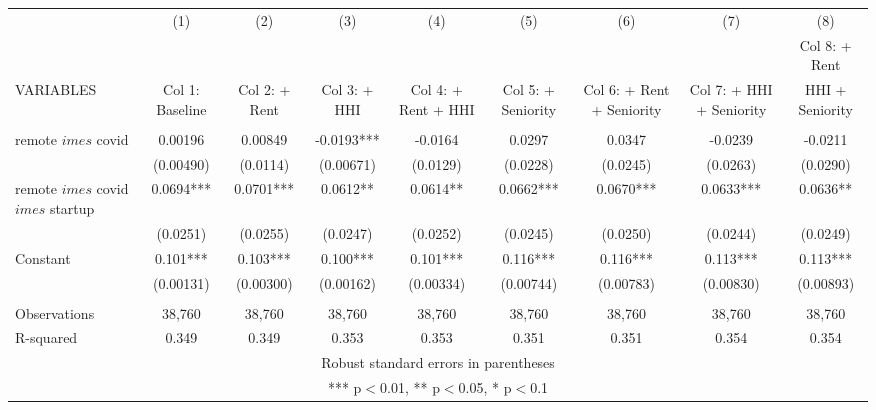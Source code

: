 \documentclass[]{article}
\begin{document}
\begin{tabular}{lcccccccc} \hline
 & (1) & (2) & (3) & (4) & (5) & (6) & (7) & (8) \\
 &  &  &  &  &  &  &  & Col 8: + Rent \\
VARIABLES & Col 1: Baseline & Col 2: + Rent & Col 3: + HHI & Col 4: + Rent + HHI & Col 5: + Seniority & Col 6: + Rent + Seniority & Col 7: + HHI + Seniority & HHI + Seniority \\ \hline
 &  &  &  &  &  &  &  &  \\
remote $	imes$ covid & 0.00196 & 0.00849 & -0.0193*** & -0.0164 & 0.0297 & 0.0347 & -0.0239 & -0.0211 \\
 & (0.00490) & (0.0114) & (0.00671) & (0.0129) & (0.0228) & (0.0245) & (0.0263) & (0.0290) \\
remote $	imes$ covid $	imes$ startup & 0.0694*** & 0.0701*** & 0.0612** & 0.0614** & 0.0662*** & 0.0670*** & 0.0633*** & 0.0636** \\
 & (0.0251) & (0.0255) & (0.0247) & (0.0252) & (0.0245) & (0.0250) & (0.0244) & (0.0249) \\
Constant & 0.101*** & 0.103*** & 0.100*** & 0.101*** & 0.116*** & 0.116*** & 0.113*** & 0.113*** \\
 & (0.00131) & (0.00300) & (0.00162) & (0.00334) & (0.00744) & (0.00783) & (0.00830) & (0.00893) \\
 &  &  &  &  &  &  &  &  \\
Observations & 38,760 & 38,760 & 38,760 & 38,760 & 38,760 & 38,760 & 38,760 & 38,760 \\
 R-squared & 0.349 & 0.349 & 0.353 & 0.353 & 0.351 & 0.351 & 0.354 & 0.354 \\ \hline
\multicolumn{9}{c}{ Robust standard errors in parentheses} \\
\multicolumn{9}{c}{ *** p$<$0.01, ** p$<$0.05, * p$<$0.1} \\
\end{tabular}
\end{document}
